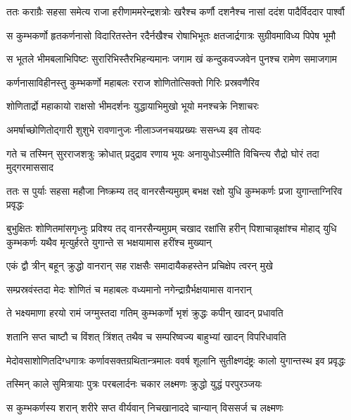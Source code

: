 \twolineshloka
{ततः कराग्रैः सहसा समेत्य राजा हरीणाममरेन्द्रशत्रोः}
{खरैश्च कर्णौ दशनैश्च नासां ददंश पादैर्विददार पार्श्वौ} %

\twolineshloka
{स कुम्भकर्णो हृतकर्णनासो विदारितस्तेन रदैर्नखैश्च}
{रोषाभिभूतः क्षतजार्द्रगात्रः सुग्रीवमाविध्य पिपेष भूमौ} %

\twolineshloka
{स भूतले भीमबलाभिपिष्टः सुरारिभिस्तैरभिहन्यमानः}
{जगाम खं कन्दुकवज्जवेन पुनश्च रामेण समाजगाम} %

\twolineshloka
{कर्णनासाविहीनस्तु कुम्भकर्णो महाबलः}
{रराज शोणितोत्सिक्तो गिरिः प्रस्रवणैरिव} %

\twolineshloka
{शोणितार्द्रो महाकायो राक्षसो भीमदर्शनः}
{युद्धायाभिमुखो भूयो मनश्चक्रे निशाचरः} %

\twolineshloka
{अमर्षाच्छोणितोद्गारी शुशुभे रावणानुजः}
{नीलाञ्जनचयप्रख्यः ससन्ध्य इव तोयदः} %

\twolineshloka
{गते च तस्मिन् सुरराजशत्रुः क्रोधात् प्रदुद्राव रणाय भूयः}
{अनायुधोऽस्मीति विचिन्त्य रौद्रो घोरं तदा मुद्गरमाससाद} %

\twolineshloka
{ततः स पुर्याः सहसा महौजा निष्क्रम्य तद् वानरसैन्यमुग्रम्}
{बभक्ष रक्षो युधि कुम्भकर्णः प्रजा युगान्ताग्निरिव प्रवृद्धः} %

\threelineshloka
{बुभुक्षितः शोणितमांसगृध्नुः प्रविश्य तद् वानरसैन्यमुग्रम्}
{चखाद रक्षांसि हरीन् पिशाचान्नृक्षांश्च मोहाद् युधि कुम्भकर्णः}
{यथैव मृत्युर्हरते युगान्ते स भक्षयामास हरींश्च मुख्यान्} %

\twolineshloka
{एकं द्वौ त्रीन् बहून् क्रुद्धो वानरान् सह राक्षसैः}
{समादायैकहस्तेन प्रचिक्षेप त्वरन् मुखे} %

\twolineshloka
{सम्प्रस्रवंस्तदा मेदः शोणितं च महाबलः}
{वध्यमानो नगेन्द्राग्रैर्भक्षयामास वानरान्} %

\twolineshloka
{ते भक्ष्यमाणा हरयो रामं जग्मुस्तदा गतिम्}
{कुम्भकर्णो भृशं क्रुद्धः कपीन् खादन् प्रधावति} %

\twolineshloka
{शतानि सप्त चाष्टौ च विंशत् त्रिंशत् तथैव च}
{सम्परिष्वज्य बाहुभ्यां खादन् विपरिधावति} %

\twolineshloka
{मेदोवसाशोणितदिग्धगात्रः कर्णावसक्तग्रथितान्त्रमालः}
{ववर्ष शूलानि सुतीक्ष्णदंष्ट्रः कालो युगान्तस्थ इव प्रवृद्धः} %

\twolineshloka
{तस्मिन् काले सुमित्रायाः पुत्रः परबलार्दनः}
{चकार लक्ष्मणः क्रुद्धो युद्धं परपुरञ्जयः} %

\twolineshloka
{स कुम्भकर्णस्य शरान् शरीरे सप्त वीर्यवान्}
{निचखानाददे चान्यान् विससर्ज च लक्ष्मणः} %

